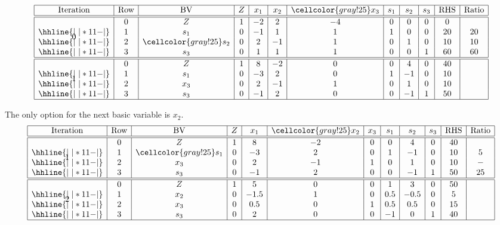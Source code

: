 \documentclass[12pt]{article}
\theoremstyle{definition}
\begin{document}
\[\begin{array}{*{12}{|c}|}
    \hline
    \text{Iteration} & \text{Row} & \text{BV} & Z & x_1 & x_2 & \cellcolor{gray!25}x_3 & s_1 & s_2 & s_3 & \text{RHS} & \text{Ratio} \\\hline\hline
    \multirow{4}*{0}
    & 0 & Z   & 1 & -2 & 2  & -4 & 0 & 0 & 0 & 0  & \\\hhline{|~|*{11}{-}|}
    & 1 & s_1 & 0 & -1 & 1  & 1  & 1 & 0 & 0 & 20 & 20 \\\hhline{|~|*{11}{-}|}
    & 2 & \cellcolor{gray!25}s_2 & 0 & 2  & -1 & 1  & 0 & 1 & 0 & 10 & 10 \\\hhline{|~|*{11}{-}|}
    & 3 & s_3 & 0 & 1  & 1  & 1  & 0 & 0 & 1 & 60 & 60 \\\hline
    \hline
    \multirow{4}*{1}
    & 0 & Z   & 1 & 8 & -2  & 0 & 0 & 4 & 0 & 40 & \\\hhline{|~|*{11}{-}|}
    & 1 & s_1 & 0 & -3 & 2  & 0  & 1 & -1 & 0 & 10 & \\\hhline{|~|*{11}{-}|}
    & 2 & x_3 & 0 & 2  & -1 & 1  & 0 & 1 & 0 & 10 & \\\hhline{|~|*{11}{-}|}
    & 3 & s_3 & 0 & -1  & 2  & 0  & 0 & -1 & 1 & 50 & \\\hline
\end{array}\]

The only option for the next basic variable is $x_2$.
\[\begin{array}{*{12}{|c}|}
    \hline
    \text{Iteration} & \text{Row} & \text{BV} & Z & x_1 & \cellcolor{gray!25}x_2 & x_3 & s_1 & s_2 & s_3 & \text{RHS} & \text{Ratio} \\\hline\hline
    \multirow{4}*{1}
    & 0 & Z   & 1 & 8 & -2  & 0 & 0 & 4 & 0 & 40 & \\\hhline{|~|*{11}{-}|}
    & 1 & \cellcolor{gray!25}s_1 & 0 & -3 & 2  & 0  & 1 & -1 & 0 & 10 & 5 \\\hhline{|~|*{11}{-}|}
    & 2 & x_3 & 0 & 2  & -1 & 1  & 0 & 1 & 0 & 10 & - \\\hhline{|~|*{11}{-}|}
    & 3 & s_3 & 0 & -1  & 2  & 0  & 0 & -1 & 1 & 50 & 25 \\\hline
    \hline
    \multirow{4}*{2}
    & 0 & Z   & 1 & 5 & 0  & 0 & 1 & 3 & 0 & 50 & \\\hhline{|~|*{11}{-}|}
    & 1 & x_2 & 0 & -1.5 & 1  & 0  & 0.5 & -0.5 & 0 & 5 & \\\hhline{|~|*{11}{-}|}
    & 2 & x_3 & 0 & 0.5  & 0 & 1  & 0.5 & 0.5 & 0 & 15 & \\\hhline{|~|*{11}{-}|}
    & 3 & s_3 & 0 & 2  & 0  & 0  & -1 & 0 & 1 & 40 & \\\hline
\end{array}\]
\end{document}
